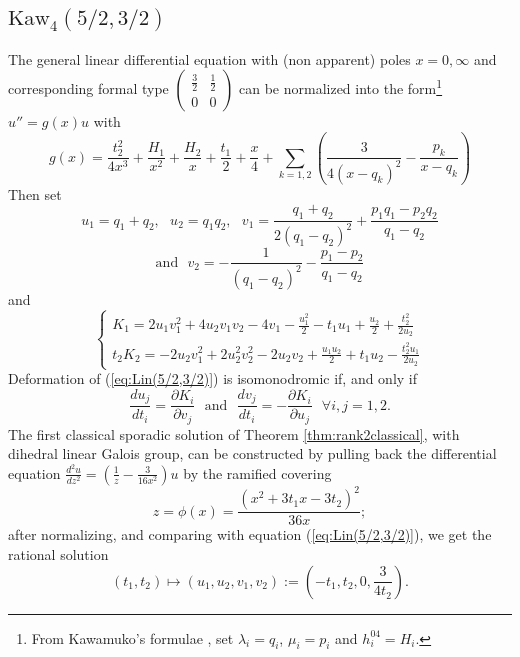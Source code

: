 \documentclass[12]{amsart}
\begin{document}
\subsection{$\mathrm{Kaw}_4(5/2,3/2)$}
The general linear differential equation with (non apparent) poles $x=0,\infty$
and corresponding formal type $\begin{pmatrix}\frac{3}{2}&\frac{1}{2}\\ 0&0\end{pmatrix}$ can be normalized into the form\footnote{From Kawamuko's formulae \cite{Kawamuko}, set $\lambda_i=q_i$, $\mu_i=p_i$
and $h_i^{04}=H_i$.} $u''=g(x)u$ with
\begin{equation}\label{eq:Lin(5/2,3/2)}
g(x)=\frac{t_2^2}{4x^3}+\frac{H_1}{x^2}+\frac{H_2}{x}+\frac{t_1}{2}+\frac{x}{4}+\sum_{k=1,2}\left(\frac{3}{4(x-q_k)^2}-\frac{p_k}{x-q_k}\right)
\end{equation}
Then set 
$$u_1=q_1+q_2,\ \ \ u_2=q_1q_2,\ \ \ v_1=\frac{q_1+q_2}{2(q_1-q_2)^2}+\frac{p_1q_1-p_2q_2}{q_1-q_2}$$
$$\text{and}\ \ \ v_2=-\frac{1}{(q_1-q_2)^2}-\frac{p_1-p_2}{q_1-q_2}$$
and 
$$\left\{\begin{matrix}
K_1=2u_1v_1^2+4u_2v_1v_2-4v_1-\frac{u_1^2}{2}-t_1u_1+\frac{u_2}{2}+\frac{t_2^2}{2u_2}\\
t_2K_2=-2u_2v_1^2+2u_2^2v_2^2-2u_2v_2+\frac{u_1u_2}{2}+t_1u_2-\frac{t_2^2u_1}{2u_2}
\end{matrix}\right.$$
Deformation of (\ref{eq:Lin(5/2,3/2)}) is isomonodromic if, and only if
$$\frac{du_j}{dt_i}=\frac{\partial K_i}{\partial v_j}\ \ \ \text{and}\ \ \ \frac{dv_j}{dt_i}=-\frac{\partial K_i}{\partial u_j}\ \ \ 
\forall i,j=1,2.$$
The first classical sporadic solution of Theorem \ref{thm:rank2classical}, 
with dihedral linear Galois group, can be constructed by 
pulling back the differential equation $\frac{d^2u}{d z^2}=\left(\frac{1}{z}-\frac{3}{16x^2}\right)u$ by the ramified covering
$$z=\phi(x)=\frac{(x^2+3t_1x-3t_2)^2}{36 x};$$
after normalizing, and comparing with equation (\ref{eq:Lin(5/2,3/2)}), we get the rational solution
$$(t_1,t_2)\mapsto(u_1,u_2,v_1,v_2):=\left(-t_1,t_2,0,\frac{3}{4t_2}\right).$$






\end{document}
